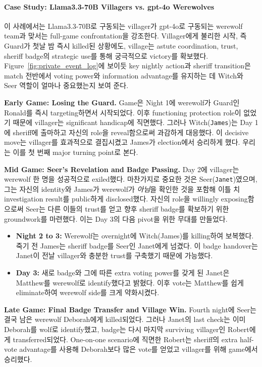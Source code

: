 \paragraph{Case Study: Llama3.3-70B Villagers vs. gpt-4o Werewolves}
\label{sec:case_llama33_gpt4o}
이 사례에서는 Llama3.3-70B로 구동되는 villager가 gpt-4o로 구동되는 werewolf team과 맞서는 full-game confrontation을 강조한다. Villager에게 불리한 시작, 즉 Guard가 첫날 밤 즉시 killed된 상황에도, village는 astute coordination, trust, sheriff badge의 strategic use를 통해 궁극적으로 victory를 확보했다. Figure~\ref{fig:private_event_log}에 보이듯 key nightly action과 sheriff transition은 match 전반에서 voting power와 information advantage를 유지하는 데 Witch와 Seer 역할이 얼마나 중요했는지 보여 준다.

\textbf{Early Game: Losing the Guard.}
Game은 Night 1에 werewolf가 Guard인 Ronald를 즉시 targeting하면서 시작되었다. 이후 functioning protection role이 없었기 때문에 villager는 significant handicap에 직면했다. 그러나 Witch(\texttt{James})는 Day 1에 sheriff에 출마하고 자신의 role을 reveal함으로써 과감하게 대응했다. 이 decisive move는 villager를 효과적으로 결집시켰고 James가 election에서 승리하게 했다. 우리는 이를 첫 번째 major turning point로 본다.

\textbf{Mid Game: Seer’s Revelation and Badge Passing.}
Day 2에 villager는 werewolf 한 명을 성공적으로 exiled했다. 마찬가지로 중요한 것은 Seer(\texttt{Janet})였으며, 그는 자신의 identity와 James가 werewolf가 \emph{아님}을 확인한 것을 포함해 이틀 치 investigation result를 public하게 disclosed했다. 자신의 role을 willingly exposing함으로써 Seer는 다른 이들의 trust를 얻고 향후 sheriff badge를 확보하기 위한 groundwork를 마련했다. 이는 Day 3의 다음 pivot을 위한 무대를 만들었다.

\begin{itemize}
    \item \textbf{Night 2 to 3:} Werewolf는 overnight에 Witch(James)를 killing하여 보복했다. 죽기 전 James는 sheriff badge를 Seer인 Janet에게 넘겼다. 이 badge handover는 Janet이 전날 villager와 충분한 trust를 구축했기 때문에 가능했다.
    \item \textbf{Day 3:} 새로 badge와 그에 따른 extra voting power를 갖게 된 Janet은 Matthew를 werewolf로 identify했다고 밝혔다. 이후 vote는 Matthew를 쉽게 eliminate하여 werewolf side를 크게 약화시켰다.
\end{itemize}

\textbf{Late Game: Final Badge Transfer and Village Win.}
Fourth night에 Seer는 결국 남은 werewolf Deborah에게 killed되었다. 그러나 Janet의 last check는 이미 Deborah를 wolf로 identify했고, badge는 다시 마지막 surviving villager인 Robert에게 transferred되었다. One-on-one scenario에 직면한 Robert는 sheriff의 extra half-vote advantage를 사용해 Deborah보다 많은 vote를 얻었고 villager를 위해 game에서 승리했다.

